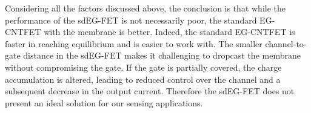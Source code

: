 Considering all the factors discussed above, the conclusion is that while the performance of the sdEG-FET is not necessarily poor, the standard EG-CNTFET with the membrane is better. Indeed, the standard EG-CNTFET is faster in reaching equilibrium and is easier to work with. The smaller channel-to-gate distance in the sdEG-FET makes it challenging to dropcast the membrane without compromising the gate. If the gate is partially covered, the charge accumulation is altered, leading to reduced control over the channel and a subsequent decrease in the output current. Therefore the sdEG-FET does not present an ideal solution for our sensing applications.
